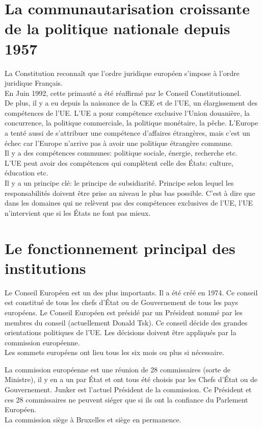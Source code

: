 \documentclass[12pt, a4paper, openany]{book}
\begin{document}
\section{La communautarisation croissante de la politique nationale depuis 1957}

La Constitution reconnaît que l'ordre juridique européen s'impose à l'ordre juridique Français. \\
En Juin 1992, cette primauté a été réaffirmé par le Conseil Constitutionnel. \\
De plus, il y a eu depuis la naissance de la CEE et de l'UE, un élargissement des compétences de l'UE. L'UE a pour compétence exclusive l'Union douanière, la concurrence, la politique commerciale, la politique monétaire, la pêche. L'Europe a tenté aussi de s'attribuer une compétence d'affaires étrangères, mais c'est un échec car l'Europe n'arrive pas à avoir une politique étrangère commune. \\
Il y a des compétences communes: politique sociale, énergie, recherche etc. \\
L'UE peut avoir des compétences qui complètent celle des États: culture, éducation etc. \\
Il y a un principe clé: le principe de subsidiarité. Principe selon lequel les responsabilités doivent être prise au niveau le plus bas possible. C'est à dire que dans les domaines qui ne relèvent pas des compétences exclusives de l'UE, l'UE n'intervient que si les États ne font pas mieux. 

\section{Le fonctionnement principal des institutions}

Le Conseil Européen est un des plus importants. Il a été créé en 1974. Ce conseil est constitué de tous les chefs d'État ou de Gouvernement de tous les pays européens. Le Conseil Européen est présidé par un Président nommé par les membres du conseil (actuellement Donald Tsk). Ce conseil décide des grandes orientations politiques de l'UE. Les décisions doivent être appliqués par la commission européenne. \\
Les sommets européens ont lieu tous les six mois ou plus si nécessaire. 


La commission européenne est une réunion de 28 commissaires (sorte de Ministre), il y en a un par État et ont tous été choisis par les Chefs d'État ou de Gouvernement. Junker est l'actuel Président de la commission. Ce Président et ces 28 commissaires ne peuvent siéger que si ils ont la confiance du Parlement Européen. \\
La commission siège à Bruxelles et siège en permanence. 
\end{document}
